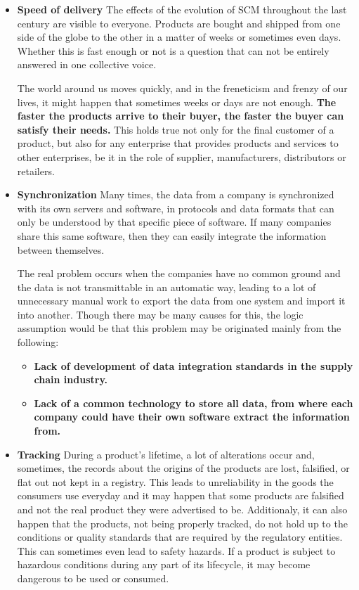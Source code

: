 \begin{itemize}
\item \textbf{Speed of delivery}
The effects of the evolution of SCM throughout the last century are visible to everyone. Products are bought and shipped from one side of the globe to the other in a matter of weeks or sometimes even days. Whether this is fast enough or not is a question that can not be entirely answered in one collective voice. 

The world around us moves quickly, and in the freneticism and frenzy of our lives, it might happen that sometimes weeks or days are not enough. \textbf{The faster the products arrive to their buyer, the faster the buyer can satisfy their needs.} This holds true not only for the final customer of a product, but also for any enterprise that provides products and services to other enterprises, be it in the role of supplier, manufacturers, distributors or retailers.

\item \textbf{Synchronization}
Many times, the data from a company is synchronized with its own servers and software, in protocols and data formats that can only be understood by that specific piece of software. If many companies share this same software, then they can easily integrate the information between themselves.

The real problem occurs when the companies have no common ground and the data is not transmittable in an automatic way, leading to a lot of unnecessary manual work to export the data from one system and import it into another. Though there may be many causes for this, the logic assumption would be that this problem may be originated mainly from the following:

\begin{itemize}
\item \textbf{Lack of development of data integration standards in the supply chain industry.}
\item \textbf{Lack of a common technology to store all data, from where each company could have their own software extract the information from.}
\end{itemize}

\item \textbf{Tracking}
During a product's lifetime, a lot of alterations occur and, sometimes, the records about the origins of the products are lost, falsified, or flat out not kept in a registry. This leads to unreliability in the goods the consumers use everyday and it may happen that some products are falsified and not the real product they were advertised to be. Additionaly, it can also happen that the products, not being properly tracked, do not hold up to the conditions or quality standards that are required by the regulatory entities. This can sometimes even lead to safety hazards. If a product is subject to hazardous conditions during any part of its lifecycle, it may become dangerous to be used or consumed.


\end{itemize}
